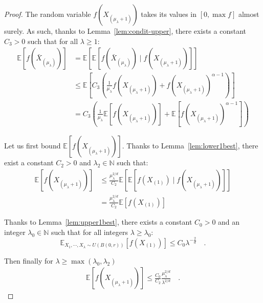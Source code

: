 \begin{proof}
The random variable $f(X_{(\mu_\lambda+1)})$ takes its values in $[0,\max f]$ almost surely. As such, thanks to Lemma~\ref{lem:condit-upper}, there exists a constant $C_3>0$ such that for all $\lambda\geq 1$:
 \begin{align*}
      \mathbb{E}\left[f(\bar{X}_{(\mu_\lambda)})\right]&=\mathbb{E}\left[\mathbb{E}\left[f(\bar{X}_{(\mu_\lambda)})\mid f(X_{(\mu_\lambda+1)}) \right]\right]\\
        &\leq \mathbb{E}\left[C_3\left(\frac{1}{\mu_\lambda}f(X_{(\mu_\lambda+1)})+f(X_{(\mu_\lambda+1)})^{\alpha-1}\right)\right]\\
      &= C_3\left(\frac{1}{\mu_\lambda}\mathbb{E}\left[f(X_{(\mu_\lambda+1)})\right]+\mathbb{E}\left[f(X_{(\mu_\lambda+1)})^{\alpha-1}\right]\right)
 \end{align*}
 
Let us first bound $\mathbb{E}\left[f(X_{(\mu_\lambda+1)})\right]$. Thanks to Lemma~\ref{lem:lower1best}, there exist a constant $C_2>0$ and $\lambda_2\in \mathbb{N}$ such that:
\begin{align*}
  \mathbb{E} \left[f(X_{(\mu_\lambda+1)})\right]&\leq \frac{\mu_\lambda^{2/d}}{C_2}\mathbb{E}\left[\mathbb{E} \left[f(X_{(1)})\mid f(X_{(\mu_\lambda+1)})\right]\right]\\
  &=\frac{\mu_\lambda^{2/d}}{C_2}\mathbb{E} \left[f(X_{(1)})\right]
\end{align*}

Thanks to Lemma~\ref{lem:upper1best}, there exists a constant $C_0>0$ and an integer $\lambda_0\in \mathbb{N}$ such that for all integers $ \lambda\geq \lambda_0$:
$$\mathbb{E}_{X_1,\cdots,X_\lambda\sim U(B(0,r))}\left[ f\left(X_{(1)}\right)\right] \leq C_0 \lambda^{-\frac2d}\quad. $$

Then finally for $\lambda\geq\max(\lambda_0,\lambda_2)$
\begin{align*}
    \mathbb{E} \left[f(X_{(\mu_\lambda+1)})\right]\leq\frac{C_0}{C_2} \frac{\mu_\lambda^{2/d}}{\lambda^{2/d}}\quad.
\end{align*}


\end{proof}
